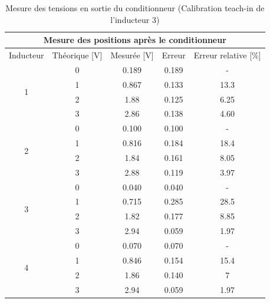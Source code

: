 \begin{table}[H]
    \centering
    \begin{tabular}{|c|c|c|c|c|}
        \hline
        \multicolumn{5}{|c|}{\textbf{Mesure des positions après le conditionneur}}                   \\ \hline
        Inducteur          & Théorique {[}V{]} & Mesurée {[}V{]} & Erreur & Erreur relative {[}\%{]} \\ \hline
        \multirow{4}{*}{1} & 0                 & 0.189           & 0.189  & -                        \\ \cline{2-5}
                           & 1                 & 0.867           & 0.133  & 13.3                     \\ \cline{2-5}
                           & 2                 & 1.88            & 0.125  & 6.25                     \\ \cline{2-5}
                           & 3                 & 2.86            & 0.138  & 4.60                     \\ \hline
        \multirow{4}{*}{2} & 0                 & 0.100           & 0.100  & -                        \\ \cline{2-5}
                           & 1                 & 0.816           & 0.184  & 18.4                     \\ \cline{2-5}
                           & 2                 & 1.84            & 0.161  & 8.05                     \\ \cline{2-5}
                           & 3                 & 2.88            & 0.119  & 3.97                     \\ \hline
        \multirow{4}{*}{3} & 0                 & 0.040           & 0.040  & -                        \\ \cline{2-5}
                           & 1                 & 0.715           & 0.285  & 28.5                     \\ \cline{2-5}
                           & 2                 & 1.82            & 0.177  & 8.85                     \\ \cline{2-5}
                           & 3                 & 2.94            & 0.059  & 1.97                     \\ \hline
        \multirow{4}{*}{4} & 0                 & 0.070           & 0.070  & -                        \\ \cline{2-5}
                           & 1                 & 0.846           & 0.154  & 15.4                     \\ \cline{2-5}
                           & 2                 & 1.86            & 0.140  & 7                        \\ \cline{2-5}
                           & 3                 & 2.94            & 0.059  & 1.97                     \\ \hline
    \end{tabular}
    \caption{Mesure des tensions en sortie du conditionneur (Calibration teach-in de l'inducteur 3)}
    \label{tab:teachin_3_cond}
\end{table}

